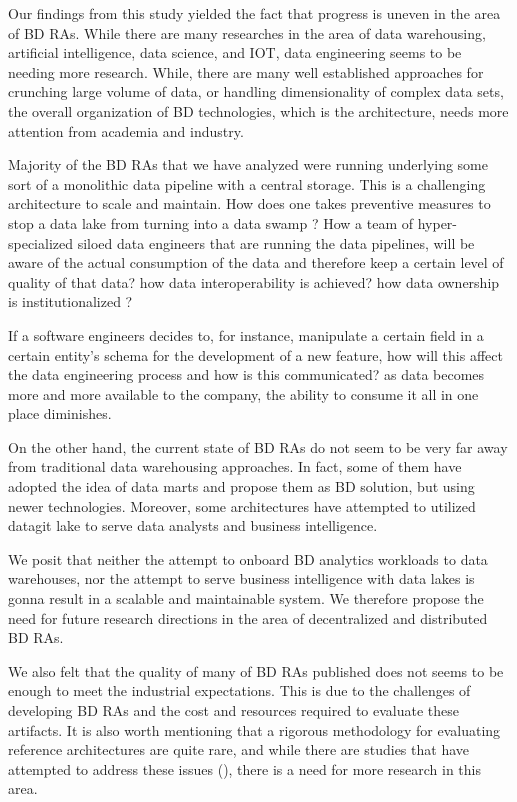 \documentclass{ieeeaccess}
\begin{document}
Our findings from this study yielded the fact that progress is uneven in the area of BD RAs. While there are many researches in the area of data warehousing, artificial intelligence, data science, and IOT, data engineering seems to be needing more research. While, there are many well established approaches for crunching large volume of data, or handling dimensionality of complex data sets, the overall organization of BD technologies, which is the architecture, needs more attention from academia and industry. 

Majority of the BD RAs that we have analyzed were running underlying some sort of a monolithic data pipeline with a central storage. This is a challenging architecture to scale and maintain. How does one takes preventive measures to stop a data lake from turning into a data swamp ? How a team of hyper-specialized siloed data engineers that are running the data pipelines, will be aware of the actual consumption of the data and therefore keep a certain level of quality of that data? how data interoperability is achieved? how data ownership is institutionalized ?

If a software engineers decides to, for instance, manipulate a certain field in a certain entity's schema for the development of a new feature, how will this affect the data engineering process and how is this communicated? as data becomes more and more available to the company, the ability to consume it all in one place diminishes. 

On the other hand, the current state of BD RAs do not seem to be very far away from traditional data warehousing approaches. In fact, some of them have adopted the idea of data marts and propose them as BD solution, but using newer technologies. Moreover, some architectures have attempted to utilized datagit lake to serve data analysts and business intelligence. 

We posit that neither the attempt to onboard BD analytics workloads to data warehouses, nor the attempt to serve business intelligence with data lakes is gonna result in a scalable and maintainable system. We therefore propose the need for future research directions in the area of decentralized and distributed BD RAs. 

We also felt that the quality of many of BD RAs published does not seems to be enough to meet the industrial expectations. This is due to the challenges of developing BD RAs and the cost and resources required to evaluate these artifacts. It is also worth mentioning that a rigorous methodology for evaluating reference architectures are quite rare, and while there are studies that have attempted to address these issues (\cite{angelov2008towards}), there is a need for more research in this area.
\end{document}
